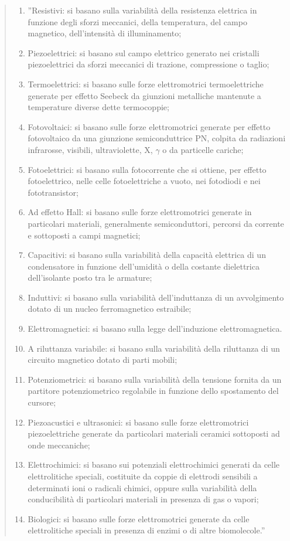 \documentclass[a4paper]{report} %
\begin{document}
\begin{quote}
	\begin{enumerate}
		\item ''Resistivi: si basano sulla variabilità della resistenza elettrica in funzione degli sforzi meccanici, della temperatura, del campo magnetico, dell'intensità di illuminamento;
		\item Piezoelettrici: si basano sul campo elettrico generato nei cristalli piezoelettrici da sforzi meccanici di trazione, compressione o taglio;
		\item Termoelettrici: si basano sulle forze elettromotrici termoelettriche generate per effetto Seebeck da giunzioni metalliche mantenute a temperature diverse dette termocoppie;
		\item Fotovoltaici: si basano sulle forze elettromotrici generate per effetto fotovoltaico da una giunzione semiconduttrice PN, colpita da radiazioni infrarosse, visibili, ultraviolette, X, $\gamma$ o da particelle cariche;
		\item Fotoelettrici: si basano sulla fotocorrente che si ottiene, per effetto fotoelettrico, nelle celle fotoelettriche a vuoto, nei fotodiodi e nei fototransistor;
		\item Ad effetto Hall: si basano sulle forze elettromotrici generate in particolari materiali, generalmente semiconduttori, percorsi da corrente e sottoposti a campi magnetici;
		\item Capacitivi: si basano sulla variabilità della capacità elettrica di un condensatore in funzione dell'umidità o della costante dielettrica dell'isolante posto tra le armature;
		\item Induttivi: si basano sulla variabilità dell'induttanza di un avvolgimento dotato di un nucleo ferromagnetico estraibile;
		\item Elettromagnetici: si basano sulla legge dell'induzione elettromagnetica.
		\item A riluttanza variabile: si basano sulla variabilità della riluttanza di un circuito magnetico dotato di parti mobili;
		\item Potenziometrici: si basano sulla variabilità della tensione fornita da un partitore potenziometrico regolabile in funzione dello spostamento del cursore;
		\item Piezoacustici e ultrasonici: si basano sulle forze elettromotrici piezoelettriche generate da particolari materiali ceramici sottoposti ad onde meccaniche;
		\item Elettrochimici: si basano sui potenziali elettrochimici generati da celle elettrolitiche speciali, costituite da coppie di elettrodi sensibili a determinati ioni o radicali chimici, oppure sulla variabilità della conducibilità di particolari materiali in presenza di gas o vapori;
		\item Biologici: si basano sulle forze elettromotrici generate da celle elettrolitiche speciali in presenza di enzimi o di altre biomolecole.''
	\end{enumerate}
\end{quote}
\end{document}
